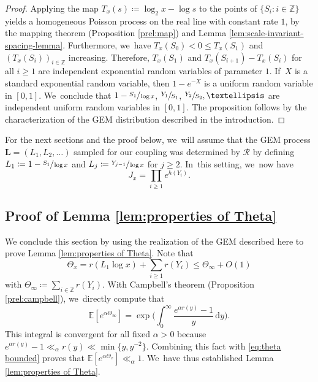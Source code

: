 \documentclass[11pt]{article}
\newcommand{\bL}{{\boldsymbol L}}
\newcommand{\ZZ}{\mathbb{Z}}
\newcommand{\EE}{\mathbb{E}}
\newcommand{\RS}{\mathscr{R}}
\newcommand{\bggg}{\bigg}
\theoremstyle{plain}
\theoremstyle{definition}
\begin{document}
\begin{proof}
Applying the map $T_x(s) \coloneqq \log_2 x - \log s$ to the points of \hbox{$\{S_i : i \in \ZZ\}$} yields a homogeneous Poisson process on the real line with constant rate $1$, by the mapping theorem (Proposition \ref{prel:map}) and Lemma \ref{lem:scale-invariant-spacing-lemma}. Furthermore, we~have \hbox{$T_x(S_0) \!<\! 0 \!\le\! T_x(S_1)$} and $(T_x(S_i))_{i \in \ZZ}$ increasing. Therefore, $T_x(S_1)$ and \hbox{$T_x(S_{i+1}) \!-\! T_x(S_i)$} for all $i \ge 1$ are independent exponential random variables of parameter $1$. If~$X$ is a standard exponential random variable, then $1-e^{-X}$ is a uniform random variable in $[0, 1]$. We~conclude that $1-\sfrac{S_1}{\log x}$, $\sfrac{Y_1}{S_1}$, $\sfrac{Y_2}{S_2},\dots$ are independent uniform random variables in $[0, 1]$. The proposition follows by the characterization of the GEM distribution described in the introduction.
\end{proof}

For the next sections and the proof below, we~will assume that the GEM process $\bL = (L_1, L_2, \ldots)$ sampled for our coupling was determined by $\RS$ by defining \hbox{$L_1 \coloneqq 1-\sfrac{S_1}{\log x}$} and $L_j \coloneqq \sfrac{Y_{j-1}}{\log x}$ for $j \ge 2$. In~this setting, we~now have
\begin{equation}
\label{eq:J_x alternative definition}
J_x = \prod_{i \ge 1} e^{h(Y_i)}.
\end{equation}

\subsection{Proof of Lemma \ref{lem:properties of Theta}}
We conclude this section by using the realization of the GEM described here to prove Lemma \ref{lem:properties of Theta}. Note that
\begin{equation}
\label{eq:theta bounded}
\Theta_x = r(L_1\log x) + \sum_{i \ge 1} r(Y_i) \le \Theta_\infty + O(1)
\end{equation}
with $\Theta_\infty \coloneqq \sum_{i \in \ZZ} r(Y_i)$. With Campbell's theorem (Proposition \ref{prel:campbell}), we~directly compute that
\begin{equation}
\label{eq:mgf theta infty}
\EE[e^{\alpha \Theta_\infty}] = \exp\!\bggg(\!\int_{0}^\infty \frac{e^{\alpha r(y)} - 1}{y}\, \mathrm dy\bggg).
\end{equation}
This integral is convergent for all fixed $\alpha \!>\! 0$ because $e^{\alpha r(y)} -1 \!\ll_\alpha\! r(y) \!\ll\!\min\{y,y^{-2}\}$. Combining this fact with \eqref{eq:theta bounded} proves that $\EE[e^{\alpha \Theta_x}] \ll_\alpha 1$. We~have thus established Lemma \ref{lem:properties of Theta}.
\end{document}
